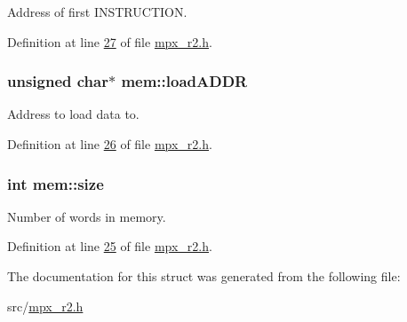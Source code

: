 Address of first INSTRUCTION. 



Definition at line \hyperlink{mpx__r2_8h_source_l00027}{27} of file \hyperlink{mpx__r2_8h_source}{mpx\_\-r2.h}.

\hypertarget{structmem_a8f5a4db03ee0560e6bd4dd602ad753c0}{
\subsubsection[{loadADDR}]{\setlength{\rightskip}{0pt plus 5cm}unsigned char$\ast$ {\bf mem::loadADDR}}}
\label{structmem_a8f5a4db03ee0560e6bd4dd602ad753c0}


Address to load data to. 



Definition at line \hyperlink{mpx__r2_8h_source_l00026}{26} of file \hyperlink{mpx__r2_8h_source}{mpx\_\-r2.h}.

\hypertarget{structmem_a2f6285207fccce5cfe6a24037bd780c3}{
\subsubsection[{size}]{\setlength{\rightskip}{0pt plus 5cm}int {\bf mem::size}}}
\label{structmem_a2f6285207fccce5cfe6a24037bd780c3}


Number of words in memory. 



Definition at line \hyperlink{mpx__r2_8h_source_l00025}{25} of file \hyperlink{mpx__r2_8h_source}{mpx\_\-r2.h}.



The documentation for this struct was generated from the following file:\begin{DoxyCompactItemize}
\item 
src/\hyperlink{mpx__r2_8h}{mpx\_\-r2.h}\end{DoxyCompactItemize}
